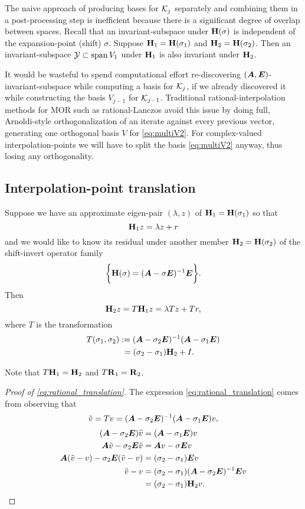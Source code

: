 The naive approach of producing bases for $\mathcal{K}_j$ separately and combining them in a post-processing step is inefficient because there is a significant degree of overlap between spaces.    Recall that an invariant-subspace  under $\textbf{\textup{H}}(\sigma)$ is independent of the expansion-point (shift) $\sigma$.  Suppose $\textbf{\textup{H}}_1 = \textbf{\textup{H}}(\sigma_1)$  and $\textbf{\textup{H}}_2=\textbf{\textup{H}}(\sigma_2)$.  Then an invariant-subspace  $\mathcal{Y}\subset \operatorname*{span} V_1$ under $\textbf{\textup{H}}_1$ is also invariant under $\textbf{\textup{H}}_2$.
 
 It would be wasteful to spend computational effort re-discovering $(\bm{A},\bm{E})$-invariant-subspace  while computing a basis for $\mathcal{K}_j$, if we already discovered it while constructing the basis $V_{j-1}$ for  $\mathcal{K}_{j-1}$. Traditional rational-interpolation methods for MOR such as rational-Lanczos \cite{gallivan1996rational} avoid this issue by doing full, Arnoldi-style orthogonalization of an iterate against every previous vector, generating one orthogonal basis $V$ for \eqref{eq:multiV2}.  For complex-valued interpolation-points we will have to split the basis \eqref{eq:multiV2} anyway, thus losing any orthogonality.




\subsection{Interpolation-point translation}\label{sec:subspace _translation}
Suppose we have an approximate eigen-pair $(\lambda,z)$ of $\textbf{\textup{H}}_1=\textbf{\textup{H}}(\sigma_1)$ so that 
\[
\textbf{\textup{H}}_1 z = \lambda z + r
\]
and we would like to know its residual under another member $\textbf{\textup{H}}_2=\textbf{\textup{H}}(\sigma_2)$ of the shift-invert operator family 
\begin{equation}
\bigg\{\textbf{\textup{H}}(\sigma) = (\bm{A}-\sigma \bm{E})^{-1}\bm{E} \bigg\}.
\label{eq:op_family}
\end{equation}
Then
\begin{equation}
\textbf{\textup{H}}_2 z = T \textbf{\textup{H}}_1 z  = \lambda T z +  T r,
\label{eq:ritz_transform_1}
\end{equation}
where $T$ is the transformation 
\begin{align}
T(\sigma_1,\sigma_2) &:= (\bm{A}-\sigma_2 \bm{E})^{-1}(\bm{A}-\sigma_1 \bm{E})\nonumber\\
&\ = (\sigma_2-\sigma_1) \textbf{\textup{H}}_2 + I.
\label{eq:rational_translation}
\end{align}


Note that  $T \textbf{\textup{H}}_1 = \textbf{\textup{H}}_2$ and $T \textbf{\textup{R}}_1 = \textbf{\textup{R}}_2$.


\begin{proof}[Proof of \eqref{eq:rational_translation}]
The expression \eqref{eq:rational_translation} comes from observing that
\[
\tilde{v} = T v = (\bm{A}-\sigma_2 \bm{E})^{-1}(\bm{A}-\sigma_1 \bm{E})v, 
\]
\begin{align*}
(\bm{A}-\sigma_2 \bm{E})\widetilde{v} &= (\bm{A}-\sigma_1 \bm{E})v \\
\bm{A} \tilde{v}- \sigma_2 \bm{E} \tilde{v} &= \bm{A} v - \sigma \bm{E} v \\
\bm{A}(\tilde{v}-v) -\sigma_2\bm{E}(\tilde{v}-v) &= (\sigma_2-\sigma_1)\bm{E} v \\
\tilde{v}-v &=  (\sigma_2-\sigma_1) (\bm{A}-\sigma_2 \bm{E})^{-1}\bm{E} v \\
&=  (\sigma_2-\sigma_1)\textbf{\textup{H}}_2 v.
\end{align*}
\end{proof}

